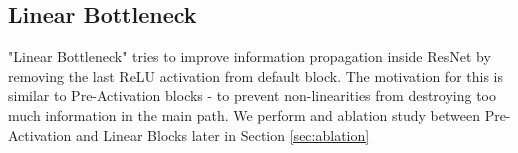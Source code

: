 \subsection{Linear Bottleneck}
"Linear Bottleneck" \cite{sandler2018_mobilenetv2} tries to improve information propagation inside ResNet by removing the last ReLU activation from default block. The motivation for this is similar to Pre-Activation blocks - to prevent non-linearities from destroying too much information in the main path. We perform and ablation study between Pre-Activation and Linear Blocks later in Section \ref{sec:ablation}














